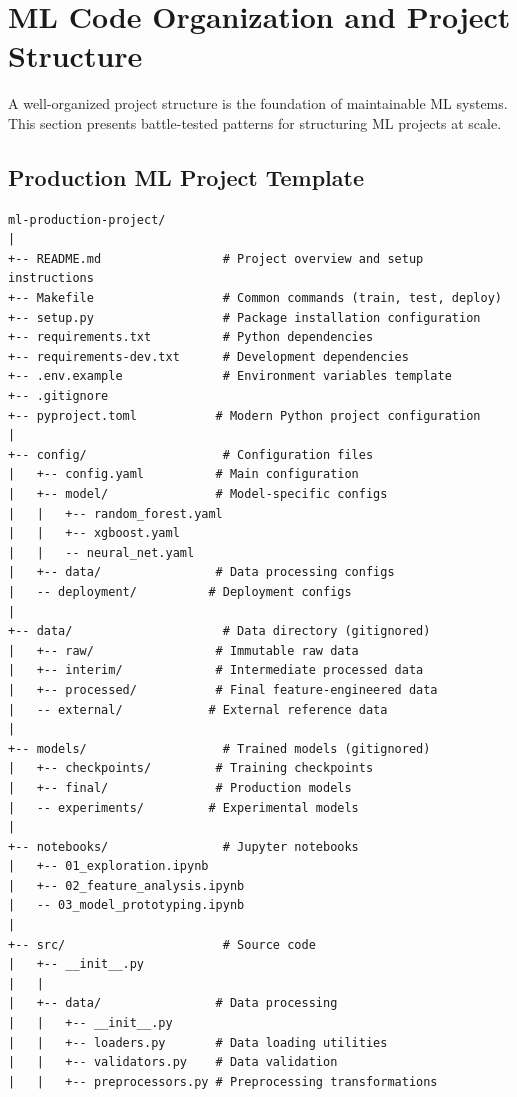 \section{ML Code Organization and Project Structure}

A well-organized project structure is the foundation of maintainable ML systems. This section presents battle-tested patterns for structuring ML projects at scale.

\subsection{Production ML Project Template}

\begin{lstlisting}[style=shell, caption=Comprehensive ML project structure]
ml-production-project/
|
+-- README.md                 # Project overview and setup instructions
+-- Makefile                  # Common commands (train, test, deploy)
+-- setup.py                  # Package installation configuration
+-- requirements.txt          # Python dependencies
+-- requirements-dev.txt      # Development dependencies
+-- .env.example              # Environment variables template
+-- .gitignore
+-- pyproject.toml           # Modern Python project configuration
|
+-- config/                   # Configuration files
|   +-- config.yaml          # Main configuration
|   +-- model/               # Model-specific configs
|   |   +-- random_forest.yaml
|   |   +-- xgboost.yaml
|   |   -- neural_net.yaml
|   +-- data/                # Data processing configs
|   -- deployment/          # Deployment configs
|
+-- data/                     # Data directory (gitignored)
|   +-- raw/                 # Immutable raw data
|   +-- interim/             # Intermediate processed data
|   +-- processed/           # Final feature-engineered data
|   -- external/            # External reference data
|
+-- models/                   # Trained models (gitignored)
|   +-- checkpoints/         # Training checkpoints
|   +-- final/               # Production models
|   -- experiments/         # Experimental models
|
+-- notebooks/                # Jupyter notebooks
|   +-- 01_exploration.ipynb
|   +-- 02_feature_analysis.ipynb
|   -- 03_model_prototyping.ipynb
|
+-- src/                      # Source code
|   +-- __init__.py
|   |
|   +-- data/                # Data processing
|   |   +-- __init__.py
|   |   +-- loaders.py       # Data loading utilities
|   |   +-- validators.py    # Data validation
|   |   +-- preprocessors.py # Preprocessing transformations

\end{lstlisting}
